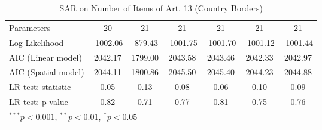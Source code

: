 \begin{table}[!h]
\begin{center}
\begin{tabular}{l c c c c c c }
Parameters              & 20           & 21           & 21           & 21           & 21           & 21           \\
Log Likelihood          & -1002.06     & -879.43      & -1001.75     & -1001.70     & -1001.12     & -1001.44     \\
AIC (Linear model)      & 2042.17      & 1799.00      & 2043.58      & 2043.46      & 2042.33      & 2042.97      \\
AIC (Spatial model)     & 2044.11      & 1800.86      & 2045.50      & 2045.40      & 2044.23      & 2044.88      \\
LR test: statistic      & 0.05         & 0.13         & 0.08         & 0.06         & 0.10         & 0.09         \\
LR test: p-value        & 0.82         & 0.71         & 0.77         & 0.81         & 0.75         & 0.76         \\
\bottomrule
\multicolumn{7}{l}{\scriptsize{$^{***}p<0.001$, $^{**}p<0.01$, $^*p<0.05$}}
\end{tabular}
\caption{SAR on Number of Items of Art. 13 (Country Borders)}
\label{table:coefficients}
\end{center}
\end{table}
